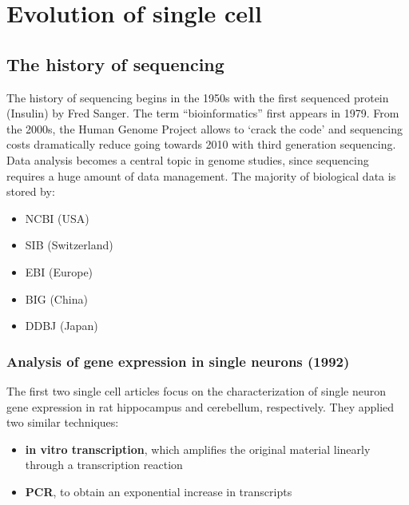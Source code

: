 \graphicspath{{chapters/01/}}
\chapter{Evolution of single cell}

\hypertarget{the-history-of-sequencing}{%
\section{The history of sequencing}\label{the-history-of-sequencing}}

The history of sequencing begins in the 1950s with the first sequenced
protein (Insulin) by Fred Sanger. The term ``bioinformatics'' first
appears in 1979. From the 2000s, the Human Genome Project allows to
`crack the code' and sequencing costs dramatically reduce going towards
2010 with third generation sequencing. Data analysis becomes a central
topic in genome studies, since sequencing requires a huge amount of data
management. The majority of biological data is stored by:

\begin{itemize}
\tightlist
\item
  NCBI (USA)
\item
  SIB (Switzerland)
\item
  EBI (Europe)
\item
  BIG (China)
\item
  DDBJ (Japan)
\end{itemize}

\hypertarget{analysis-of-gene-expression-in-single-neurons-1992}{%
\subsection{Analysis of gene expression in single neurons
(1992)}\label{analysis-of-gene-expression-in-single-neurons-1992}}

The first two single cell articles focus on the characterization of
single neuron gene expression in rat hippocampus and cerebellum,
respectively. They applied two similar techniques:

\begin{itemize}
\tightlist
\item
  \textbf{in vitro transcription},  which amplifies the original material
  linearly through a transcription reaction
\item
  \textbf{PCR},  to obtain an exponential increase in transcripts
\end{itemize}

